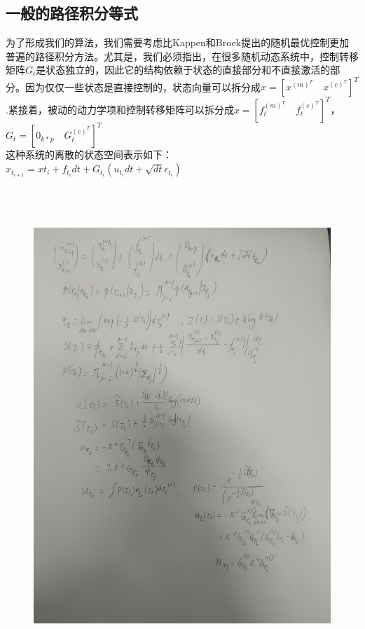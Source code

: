 \documentclass[2pt,a4paper]{article}
\begin{document}
\subsection{一般的路径积分等式}
为了形成我们的算法，我们需要考虑比Kappen和Broek提出的随机最优控制更加普遍的路径积分方法。尤其是，我们必须指出，在很多随机动态系统中，控制转移矩阵$G_t$是状态独立的，因此它的结构依赖于状态的直接部分和不直接激活的部分。因为仅仅一些状态是直接控制的，状态向量可以拆分成$x=[x^{(m)^T} \quad x^{(c)^T}]^T$.紧接着，被动的动力学项和控制转移矩阵可以拆分成$x=[f_t^{(m)^T} \quad f_t^{(c)^T}]^T$，$G_t=[0_{k*p} \quad G_t^{(c)^T}]^T$\\
这种系统的离散的状态空间表示如下：\\
$x_{t_{i+1}}=x{t_i}+f_{t_i}dt+G_{t_i}(u_{t_i}dt+\sqrt{dt}\epsilon_{t_i})$\\
\begin{figure}
    		   \centering
  		   \centerline{\includegraphics[height=18cm,angle=270]{1.jpg}}
  		   
    		\end{figure}
\end{document}
